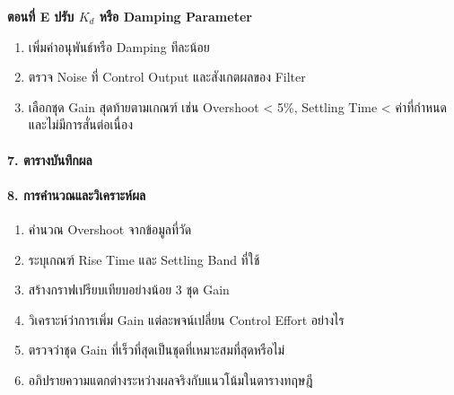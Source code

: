 \textbf{ตอนที่ E ปรับ $K_d$ หรือ Damping Parameter}

\begin{enumerate}
    \item เพิ่มค่าอนุพันธ์หรือ Damping ทีละน้อย
    \item ตรวจ Noise ที่ Control Output และสังเกตผลของ Filter
    \item เลือกชุด Gain สุดท้ายตามเกณฑ์ เช่น Overshoot < 5\%, Settling Time < ค่าที่กำหนด และไม่มีการสั่นต่อเนื่อง
\end{enumerate}

\paragraph{7. ตารางบันทึกผล}

\begin{table}[htbp]
    \centering
\end{table}

\paragraph{8. การคำนวณและวิเคราะห์ผล}

\begin{enumerate}
    \item คำนวณ Overshoot จากข้อมูลที่วัด
    \item ระบุเกณฑ์ Rise Time และ Settling Band ที่ใช้
    \item สร้างกราฟเปรียบเทียบอย่างน้อย 3 ชุด Gain
    \item วิเคราะห์ว่าการเพิ่ม Gain แต่ละพจน์เปลี่ยน Control Effort อย่างไร
    \item ตรวจว่าชุด Gain ที่เร็วที่สุดเป็นชุดที่เหมาะสมที่สุดหรือไม่
    \item อภิปรายความแตกต่างระหว่างผลจริงกับแนวโน้มในตารางทฤษฎี
\end{enumerate}

